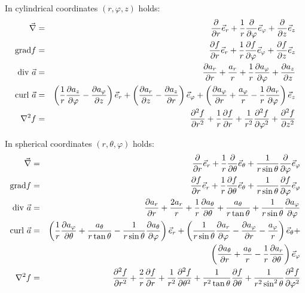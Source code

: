 \documentclass[a4paper,fancyheadings,twoside]{report}
\begin{document}
In cylindrical coordinates $(r,\varphi,z)$ holds:
\begin{eqnarray*}
\vec{\nabla}     &=&\Q{}{r}\ee{r}+\frac{1}{r}\Q{}{\varphi}\ee{\varphi}+\Q{}{z}\ee{z}\\
{\rm grad}f      &=&\Q{f}{r}\ee{r}+\frac{1}{r}\Q{f}{\varphi}\ee{\varphi}+\Q{f}{z}\ee{z}\\
{\rm div}~\vec{a}&=&\Q{a_r}{r}+\frac{a_r}{r}+\frac{1}{r}\Q{a_\varphi}{\varphi}+\Q{a_z}{z}\\
{\rm curl}~\vec{a}&=&\left(\frac{1}{r}\Q{a_z}{\varphi}-\Q{a_\varphi}{z}\right)\ee{r}+
                    \left(\Q{a_r}{z}-\Q{a_z}{r}\right)\ee{\varphi}+
                    \left(\Q{a_\varphi}{r}+\frac{a_\varphi}{r}-\frac{1}{r}\Q{a_r}{\varphi}\right)\ee{z}\\
\nabla^2 f       &=&\QQ{f}{r}+\frac{1}{r}\Q{f}{r}+\frac{1}{r^2}\QQ{f}{\varphi}+\QQ{f}{z}
\end{eqnarray*}

In spherical coordinates $(r,\theta,\varphi)$ holds:
\begin{eqnarray*}
\vec{\nabla}     &=&\Q{}{r}\ee{r}+\frac{1}{r}\Q{}{\theta}\ee{\theta}+\frac{1}{r\sin\theta}\Q{}{\varphi}\ee{\varphi}\\
{\rm grad}f      &=&\Q{f}{r}\ee{r}+\frac{1}{r}\Q{f}{\theta}\ee{\theta}+\frac{1}{r\sin\theta}\Q{f}{\varphi}\ee{\varphi}\\
{\rm div}~\vec{a}&=&\Q{a_r}{r}+\frac{2a_r}{r}+\frac{1}{r}\Q{a_\theta}{\theta}+\frac{a_\theta}{r\tan\theta}+\frac{1}{r\sin\theta}\Q{a_\varphi}{\varphi}\\
{\rm curl}~\vec{a}&=&\left(\frac{1}{r}\Q{a_\varphi}{\theta}+\frac{a_\theta}{r\tan\theta}-\frac{1}{r\sin\theta}\Q{a_\theta}{\varphi}\right)\ee{r}+
                    \left(\frac{1}{r\sin\theta}\Q{a_r}{\varphi}-\Q{a_\varphi}{r}-\frac{a_\varphi}{r}\right)\ee{\theta}+\\
                 &&\left(\Q{a_\theta}{r}+\frac{a_\theta}{r}-\frac{1}{r}\Q{a_r}{\theta}\right)\ee{\varphi}\\
\nabla^2 f       &=&\QQ{f}{r}+\frac{2}{r}\Q{f}{r}+\frac{1}{r^2}\QQ{f}{\theta}+\frac{1}{r^2\tan\theta}\Q{f}{\theta}+\frac{1}{r^2\sin^2\theta}\QQ{f}{\varphi}
\end{eqnarray*}
\end{document}
